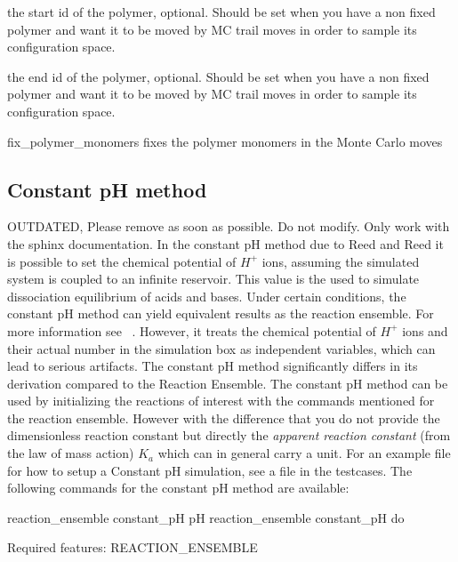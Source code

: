 \begin{arguments}
\item[\var{polymer\_start\_id}] the start id of the polymer, optional. Should be set when you have a non fixed polymer and want it to be moved by MC trail moves in order to sample its configuration space.
\item[\var{polymer\_end\_id}] the end id of the polymer, optional. Should be set when you have a non fixed polymer and want it to be moved by MC trail moves in order to sample its configuration space.
\item[fix\_polymer\_monomers] fixes the polymer monomers in the Monte Carlo moves
\end{arguments}

\subsection{Constant pH method}
OUTDATED, Please remove as soon as possible. Do not modify. Only work with the sphinx documentation.
In the constant pH method due to Reed and Reed \cite{reed92a} 
it is possible to set the chemical potential of $H^{+}$ ions, assuming
the simulated system is coupled to an infinite reservoir.
This value is the used to simulate dissociation equilibrium of acids and bases.
Under certain conditions, the constant pH method can yield equivalent
results as the reaction ensemble. For more information see ~\cite{landsgesell2016b}. 
However, it treats the chemical potential of $H^{+}$ ions and their
actual number in the simulation box as independent 
variables, which can lead to serious artifacts.
The constant pH method significantly differs in its derivation compared to the Reaction Ensemble.
The constant pH method can be used by initializing the reactions of interest with the commands
mentioned for the reaction ensemble. However with the difference that you do
not provide the dimensionless reaction constant but directly the
\textit{apparent reaction constant} (from the law of mass action) $K_a$ which
can in general carry a unit. For an example file for how to setup a Constant pH simulation, see a file in the testcases. The following commands for the constant pH method are available:
\begin{essyntax}
	 reaction_ensemble constant_pH pH 
	 reaction_ensemble constant_pH do
	
	Required features: REACTION_ENSEMBLE
\end{essyntax}

